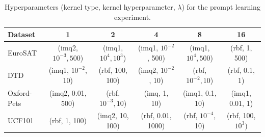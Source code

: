 
\begin{table}[ht!]
    \caption{Hyperparameters (kernel type, kernel hyperparameter, $\lambda$) for the prompt learning experiment.}\label{prompthp}
    \centering
    \footnotesize{
    \begin{tabular}{lccccc}
    \toprule
       Dataset & 1 & 2 & 4 & 8 & 16\\
       \toprule
        EuroSAT  & (imq2, $10^{-3}, 500$) & (imq1, $10^4, 10^3$) & (imq1, $10^{-2}$, 500) & (imq1, $10^4, 500$) & (rbf, 1, 500) \\
        DTD  & (imq1, $10^{-2}$, 10) & (rbf, 100, 100) & (imq2, $10^{-2}$, 10) & (rbf, $10^{-2}, 10$) & (rbf, 0.1, 1)\\
        Oxford-Pets  & (imq2, 0.01, 500) & (rbf, $10^{-3}, 10$) & (imq, 1, 10) & (imq1, 0.1, 10)  & (imq1, 0.01, 1)\\
        UCF101 & (rbf, 1, 100) & (imq2, 10, 100) & (rbf, 0.01, 1000) & (rbf, $10^{-4}$, 10) & (rbf, 100, $10^3$)\\
        \bottomrule
    \end{tabular}}
\end{table}
